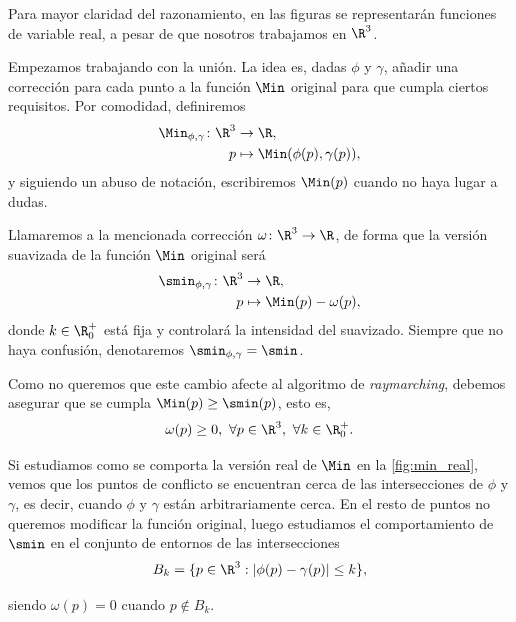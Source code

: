 \begin{observacion}
    Para mayor claridad del razonamiento, en las figuras se representarán funciones de variable real, a pesar de que nosotros trabajamos en $\R^3$.
\end{observacion}

Empezamos trabajando con la unión. La idea es, dadas $\phi$ y $\gamma$, añadir una corrección para cada punto a la función $\Min$ original para que cumpla ciertos requisitos. Por comodidad, definiremos 
\begin{align*}
      \Min_{\phi,\gamma}\colon \R^3 &\to \R,\\
      p &\mapsto \Min(\phi(p),\gamma(p)),
\end{align*}
y siguiendo un abuso de notación, escribiremos $\Min(p)$ cuando no haya lugar a dudas.\newline

Llamaremos a la mencionada corrección $\omega\colon \R^3\to\R$, de forma que la versión suavizada de la función $\Min$ original será
\begin{align*}
      \smin_{\phi,\gamma}\colon \R^3 &\to \R,\\
      p &\mapsto \Min(p) - \omega(p),
\end{align*}
donde $k\in\R^+_0$ está fija y controlará la intensidad del suavizado. Siempre que no haya confusión, denotaremos $\smin_{\phi,\gamma} = \smin$.\newline

Como no queremos que este cambio afecte al algoritmo de \textit{raymarching}, debemos asegurar que se cumpla $\Min(p)\ge \smin(p)$, esto es,
\begin{equation*}
\omega(p)\ge 0,\ \forall p\in \R^3,\ \forall k\in \R^+_0.
\end{equation*}

Si estudiamos como se comporta la versión real de $\Min$ en la \autoref{fig:min_real}, vemos que los puntos de conflicto se encuentran cerca de las intersecciones de $\phi$ y $\gamma$, es decir, cuando $\phi$ y $\gamma$ están arbitrariamente cerca. En el resto de puntos no queremos modificar la función original, luego estudiamos el comportamiento de $\smin$ en el conjunto de entornos de las intersecciones
\begin{equation*}
    B_{k} = \{p\in\R^3 : |\phi(p)-\gamma(p)| \le k\},
\end{equation*}

siendo $\omega(p) = 0$ cuando $p\notin B_{k}$.\newline

